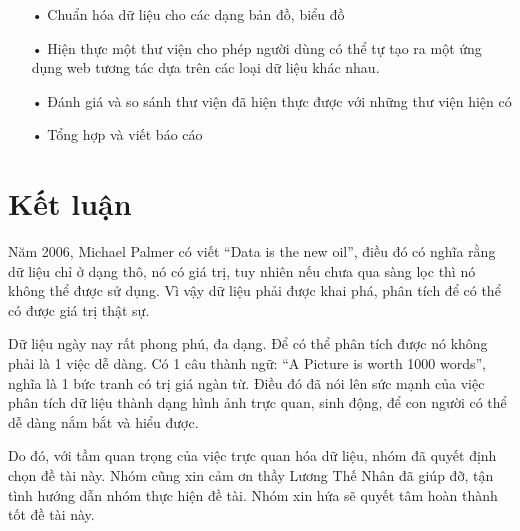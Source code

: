 \documentclass[12pt,a4paper,oneside]{article}
\begin{document}
\begin{itemize}
\item[•]Chuẩn hóa dữ liệu cho các dạng bản đồ, biểu đồ

\item[•]Hiện thực một thư viện cho phép người dùng có thể tự tạo ra một ứng dụng web tương tác dựa trên các loại dữ liệu khác nhau.

\item[•]Đánh giá và so sánh thư viện đã hiện thực được với những thư viện hiện có

\item[•]Tổng hợp và viết báo cáo

\end{itemize}


\section{Kết luận}
Năm 2006, Michael Palmer có viết “Data is the new oil”, điều đó có nghĩa rằng dữ liệu chỉ ở dạng thô, nó có giá trị, tuy nhiên nếu chưa qua sàng lọc thì nó không thể được sử dụng. Vì vậy dữ liệu phải được khai phá, phân tích để có thể có được giá trị thật sự.

Dữ liệu ngày nay rất phong phú, đa dạng. Để có thể phân tích được nó không phải là 1 việc dễ dàng. Có 1 câu thành ngữ: “A Picture is worth 1000 words”, nghĩa là 1 bức tranh có trị giá ngàn từ. Điều đó đã nói lên sức mạnh của việc phân tích dữ liệu thành dạng hình ảnh trực quan, sinh động, để con người có thể dễ dàng nắm bắt và hiểu được.

Do đó, với tầm quan trọng của việc trực quan hóa dữ liệu, nhóm đã quyết định chọn đề tài này. Nhóm cũng xin cảm ơn thầy Lương Thế Nhân đã giúp đỡ, tận tình hướng dẫn nhóm thực hiện đề tài. Nhóm xin hứa sẽ quyết tâm hoàn thành tốt đề tài này.
\end{document}
